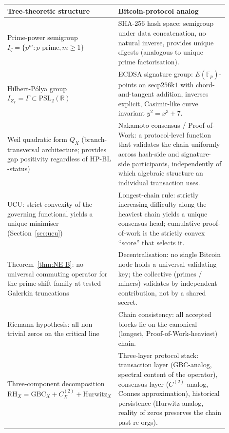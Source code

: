 \documentclass[11pt]{article}
\theoremstyle{definition}
\theoremstyle{remark}
\newcommand{\HBL}{\mathrm{HP\text{-}BL}}
\newcommand{\PSL}{\mathrm{PSL}}
\begin{document}
\begin{center}
\renewcommand{\arraystretch}{1.25}
\begin{tabular}{@{}p{0.38\linewidth} p{0.52\linewidth}@{}}
\toprule
\textbf{Tree-theoretic structure} & \textbf{Bitcoin-protocol analog} \\
\midrule
Prime-power semigroup
  $I_\zeta = \{p^m : p \text{ prime}, m \geq 1\}$ &
SHA-256 hash space: semigroup under data concatenation, no natural
inverse, provides unique digests (analogous to unique prime
factorisation). \\[0.4ex]

Hilbert-P\'olya group
  $I_{Z_\Gamma} = \Gamma \subset \PSL_2(\mathbb{R})$ &
ECDSA signature group: $E(\mathbb{F}_p)$-points on
$\mathrm{secp256k1}$ with chord-and-tangent addition, inverses
explicit, Casimir-like curve invariant $y^2 = x^3 + 7$. \\[0.4ex]

Weil quadratic form $Q_X$ (branch-transversal architecture; provides
gap positivity regardless of $\HBL$-status) &
Nakamoto consensus / Proof-of-Work: a protocol-level function that
validates the chain uniformly across hash-side and signature-side
participants, independently of which algebraic structure an
individual transaction uses. \\[0.4ex]

UCU: strict convexity of the governing functional yields a unique
minimiser (Section~\ref{sec:ucu}) &
Longest-chain rule: strictly increasing difficulty along the heaviest
chain yields a unique consensus head; cumulative proof-of-work is
the strictly convex ``score'' that selects it. \\[0.4ex]

Theorem~\ref{thm:NE-B}: no universal commuting operator for the
prime-shift family at tested Galerkin truncations &
Decentralisation: no single Bitcoin node holds a universal validating
key; the collective (primes / miners) validates by independent
contribution, not by a shared secret. \\[0.4ex]

Riemann hypothesis: all non-trivial zeros on the critical line &
Chain consistency: all accepted blocks lie on the canonical
(longest, Proof-of-Work-heaviest) chain. \\[0.4ex]

Three-component decomposition
  $\mathrm{RH}_X = \mathrm{GBC}_X + C^{(2)}_X + \mathrm{Hurwitz}_X$
  \cite{Geiger2026RHII} &
Three-layer protocol stack: transaction layer (GBC-analog, spectral
content of the operator), consensus layer ($C^{(2)}$-analog, Connes
approximation), historical persistence (Hurwitz-analog, reality of
zeros preserves the chain past re-orgs). \\[0.4ex]


\end{tabular}
\end{center}
\end{document}
